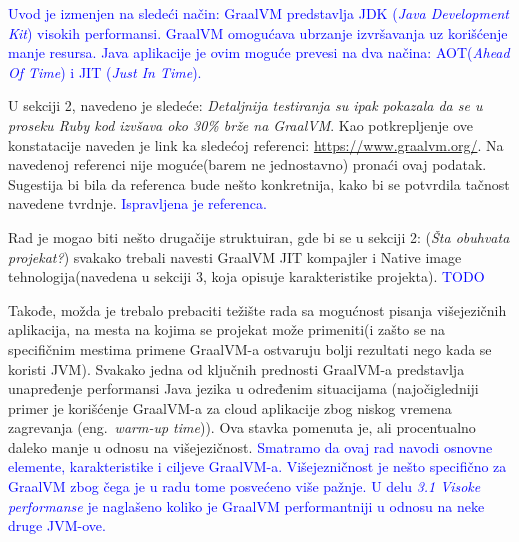 \documentclass[a4paper]{report}
\newcommand{\odgovor}[1]{\textcolor{blue}{#1}}
\begin{document}
\odgovor{
Uvod je izmenjen na sledeći način:
GraalVM predstavlja JDK (\emph{Java Development Kit}) visokih performansi\cite{graalvm}. GraalVM omogućava ubrzanje izvršavanja uz korišćenje manje resursa. Java aplikacije je ovim moguće prevesi na dva načina: AOT(\emph{Ahead Of Time}) i JIT (\emph{Just In Time}).
}

U sekciji 2, navedeno je sledeće: \textit{Detaljnija testiranja su ipak pokazala da se u proseku Ruby kod izvšava oko 30\% brže na GraalVM}. 
Kao potkrepljenje ove konstatacije naveden je link ka sledećoj referenci: \href{https://www.graalvm.org/}{https://www.graalvm.org/}. Na 
navedenoj referenci nije moguće(barem ne jednostavno) pronaći ovaj podatak. Sugestija bi bila da referenca bude nešto konkretnija, kako bi se 
potvrdila tačnost navedene tvrdnje. 
\odgovor{Ispravljena je referenca.}

Rad je mogao biti nešto drugačije struktuiran, gde bi se u sekciji 2: (\textit{Šta obuhvata projekat?}) svakako trebali navesti GraalVM JIT 
kompajler i Native image tehnologija(navedena u sekciji 3, koja opisuje karakteristike projekta). 
\odgovor{TODO}

Takođe, možda je trebalo prebaciti težište rada sa mogućnost pisanja višejezičnih aplikacija, na mesta na kojima se projekat može primeniti(i 
zašto se na specifičnim mestima primene GraalVM-a ostvaruju bolji rezultati nego kada se koristi JVM). Svakako jedna od ključnih prednosti 
GraalVM-a predstavlja unapređenje performansi Java jezika u određenim situacijama (najočigledniji primer je korišćenje GraalVM-a za cloud 
aplikacije zbog niskog vremena zagrevanja (eng.~{\em warm-up time})). Ova stavka pomenuta je, ali procentualno daleko manje u odnosu na 
višejezičnost.
\odgovor{Smatramo da ovaj rad navodi osnovne elemente, karakteristike i ciljeve GraalVM-a. Višejezničnost je nešto specifično za GraalVM zbog čega je u radu tome posvećeno više pažnje. U delu \emph{3.1 Visoke performanse} je naglašeno koliko je GraalVM performantniji u odnosu na neke druge JVM-ove.}
\end{document}
